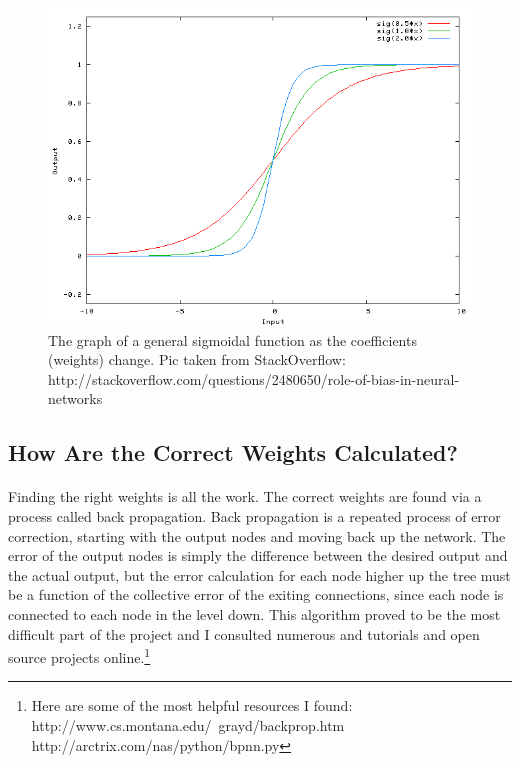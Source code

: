 \documentclass{article}
\begin{document}
    \begin{figure}
        \centering
        \includegraphics[scale=0.4]{images/bias.png}
        \caption{The graph of a general sigmoidal function as the coefficients 
            (weights) change. Pic taken from StackOverflow: 
            http://stackoverflow.com/questions/2480650/role-of-bias-in-neural-networks}
    \end{figure}

\subsection{How Are the Correct Weights Calculated?}

    \paragraph{}Finding the right weights is all the work. The correct weights are
    found via a process called back propagation. Back propagation is a repeated 
    process of error correction, starting with the output nodes and moving back up
    the network. The error of the output nodes is simply the difference between the
    desired output and the actual output, but the error calculation for each node 
    higher up the tree must be a function of the collective error of the exiting 
    connections, since each node is connected to each node in the level down. This
    algorithm proved to be the most difficult part of the project and I consulted 
    numerous and tutorials and open source projects online.\footnote{Here are
    some of the most helpful resources I found: \\  
    http://www.cs.montana.edu/~grayd/backprop.htm \\ 
    http://arctrix.com/nas/python/bpnn.py}
    
\end{document}
